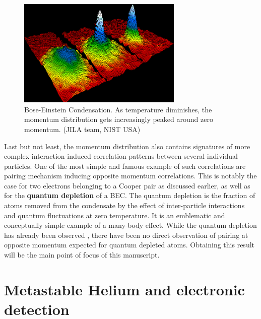 \begin{figure}
    \centering
    \includegraphics[width=0.7\textwidth]{Fig/Intro/BEC.png}
    \caption[Momentum distribution across Bose-Einstein Condensation]{Bose-Einstein Condensation. As temperature diminishes, the momentum distribution gets increasingly peaked around zero momentum. (JILA team, NIST USA)}
    \label{fig:1st_BEC}
\end{figure}


Last but not least, the momentum distribution also contains signatures of more complex interaction-induced correlation patterns between several individual particles. One of the most simple and famous example of such correlations are pairing mechanism inducing opposite momentum correlations. This is notably the case for two electrons belonging to a Cooper pair as discussed earlier, as well as for the \textbf{quantum depletion} of a BEC. The quantum depletion is the fraction of atoms removed from the condensate by the effect of inter-particle interactions and quantum fluctuations at zero temperature. It is an emblematic and conceptually simple example of a many-body effect. While the quantum depletion has already been observed \cite{chang2016,lopes2017,xu2006observation}, there have been no direct observation of pairing at opposite momentum expected for quantum depleted atoms. Obtaining this result will be the main point of focus of this manuscript.

\section*{Metastable Helium and electronic detection}

